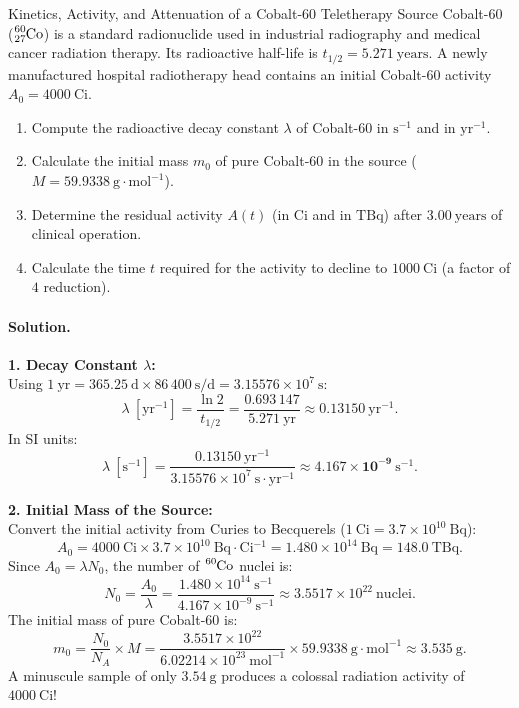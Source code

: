 \begin{workedexample}{Kinetics, Activity, and Attenuation of a Cobalt-60 Teletherapy Source}
Cobalt-60 ($\ce{^{60}_{27}Co}$) is a standard radionuclide used in industrial radiography and medical cancer radiation therapy. Its radioactive half-life is $t_{1/2} = 5.271\ \mathrm{years}$. A newly manufactured hospital radiotherapy head contains an initial Cobalt-60 activity $A_0 = 4000\ \mathrm{Ci}$.
\begin{enumerate}[leftmargin=1.4em,itemsep=3pt]
  \item Compute the radioactive decay constant $\lambda$ of Cobalt-60 in $\mathrm{s^{-1}}$ and in $\mathrm{yr^{-1}}$.
  \item Calculate the initial mass $m_0$ of pure Cobalt-60 in the source ($M = 59.9338\ \mathrm{g\cdot mol^{-1}}$).
  \item Determine the residual activity $A(t)$ (in $\mathrm{Ci}$ and in $\mathrm{TBq}$) after $3.00\ \mathrm{years}$ of clinical operation.
  \item Calculate the time $t$ required for the activity to decline to $1000\ \mathrm{Ci}$ (a factor of $4$ reduction).
\end{enumerate}

\paragraph{Solution.}
\textbf{1. Decay Constant $\lambda$:}\\
Using $1\ \mathrm{yr} = 365.25\ \mathrm{d} \times 86\,400\ \mathrm{s/d} = 3.15576 \times 10^7\ \mathrm{s}$:
\[
\lambda\ [\mathrm{yr^{-1}}] = \frac{\ln 2}{t_{1/2}} = \frac{0.693\,147}{5.271\ \mathrm{yr}} \approx \mathbf{0.13150\ \mathrm{yr^{-1}}}.
\]
In SI units:
\[
\lambda\ [\mathrm{s^{-1}}] = \frac{0.13150\ \mathrm{yr^{-1}}}{3.15576 \times 10^7\ \mathrm{s\cdot yr^{-1}}} \approx \mathbf{4.167 \times 10^{-9}\ \mathrm{s^{-1}}}.
\]

\textbf{2. Initial Mass of the Source:}\\
Convert the initial activity from Curies to Becquerels ($1\ \mathrm{Ci} = 3.7 \times 10^{10}\ \mathrm{Bq}$):
\[
A_0 = 4000\ \mathrm{Ci} \times 3.7 \times 10^{10}\ \mathrm{Bq\cdot Ci^{-1}} = 1.480 \times 10^{14}\ \mathrm{Bq} = 148.0\ \mathrm{TBq}.
\]
Since $A_0 = \lambda N_0$, the number of $\ce{^{60}Co}$ nuclei is:
\[
N_0 = \frac{A_0}{\lambda} = \frac{1.480 \times 10^{14}\ \mathrm{s^{-1}}}{4.167 \times 10^{-9}\ \mathrm{s^{-1}}} \approx 3.5517 \times 10^{22}\ \text{nuclei}.
\]
The initial mass of pure Cobalt-60 is:
\[
m_0 = \frac{N_0}{N_A} \times M = \frac{3.5517 \times 10^{22}}{6.02214 \times 10^{23}\ \mathrm{mol^{-1}}} \times 59.9338\ \mathrm{g\cdot mol^{-1}} \approx \mathbf{3.535\ \mathrm{g}}.
\]
A minuscule sample of only $3.54\ \mathrm{g}$ produces a colossal radiation activity of $4000\ \mathrm{Ci}$!


\end{workedexample}
